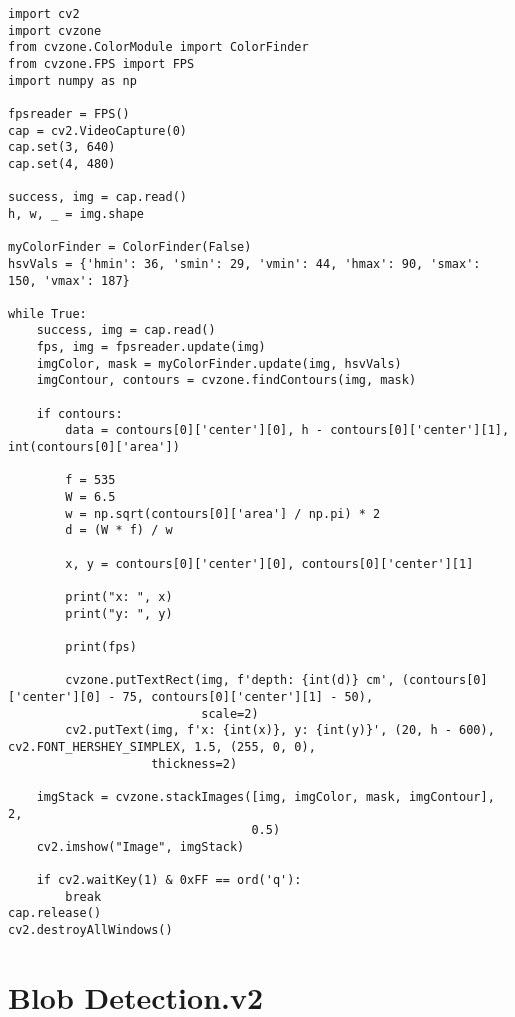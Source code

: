 \begin{lstlisting}[language=PythonPlus]
import cv2 
import cvzone 
from cvzone.ColorModule import ColorFinder
from cvzone.FPS import FPS  
import numpy as np 

fpsreader = FPS() 
cap = cv2.VideoCapture(0)  
cap.set(3, 640)  
cap.set(4, 480) 

success, img = cap.read()  
h, w, _ = img.shape  

myColorFinder = ColorFinder(False)  
hsvVals = {'hmin': 36, 'smin': 29, 'vmin': 44, 'hmax': 90, 'smax': 150, 'vmax': 187}

while True: 
    success, img = cap.read() 
    fps, img = fpsreader.update(img)
    imgColor, mask = myColorFinder.update(img, hsvVals)
    imgContour, contours = cvzone.findContours(img, mask)  

    if contours:  
        data = contours[0]['center'][0], h - contours[0]['center'][1], int(contours[0]['area'])

        f = 535
        W = 6.5
        w = np.sqrt(contours[0]['area'] / np.pi) * 2
        d = (W * f) / w

        x, y = contours[0]['center'][0], contours[0]['center'][1]

        print("x: ", x)
        print("y: ", y)

        print(fps)

        cvzone.putTextRect(img, f'depth: {int(d)} cm', (contours[0]['center'][0] - 75, contours[0]['center'][1] - 50),
                           scale=2)  
        cv2.putText(img, f'x: {int(x)}, y: {int(y)}', (20, h - 600), cv2.FONT_HERSHEY_SIMPLEX, 1.5, (255, 0, 0),
                    thickness=2)

    imgStack = cvzone.stackImages([img, imgColor, mask, imgContour], 2,
                                  0.5)
    cv2.imshow("Image", imgStack) 

    if cv2.waitKey(1) & 0xFF == ord('q'):
        break
cap.release()
cv2.destroyAllWindows()
\end{lstlisting}

\section{Blob Detection.v2}

